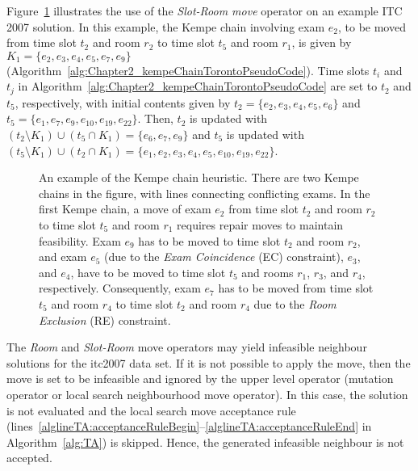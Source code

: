 Figure~\ref{fig:ITC2007KempeChain} illustrates the use of the \textit{Slot-Room move} operator on an example ITC 2007 solution. In this example, the Kempe chain involving exam $e_2$, to be moved from time slot $t_2$ and room $r_2$ to time slot $t_5$ and room $r_1$, is given by $K_1 = \{ e_2, e_3, e_4, e_5, e_7, e_9 \}$ (Algorithm~\ref{alg:Chapter2_kempeChainTorontoPseudoCode}). Time slots $t_i$ and $t_j$ in Algorithm~\ref{alg:Chapter2_kempeChainTorontoPseudoCode} are set to $t_2$ and $t_5$, respectively, with initial contents given by $t_2 = \{ e_2, e_3, e_4, e_5, e_6 \}$ and $t_5 = \{ e_1, e_7, e_9, e_{10}, e_{19}, e_{22} \}$. Then, $t_2$ is updated with $(t_2 \setminus K_1) \cup (t_5 \cap K_1) = \{ e_6, e_7, e_9 \}$ and $t_5$ is updated with $(t_5 \setminus K_1) \cup (t_2 \cap K_1) = \{ e_1, e_2, e_3, e_4, e_5,  e_{10}, e_{19}, e_{22} \}$.



\begin{figure}[!ht]
	\centering
	
	\caption{An example of the Kempe chain heuristic. There are two Kempe chains in the figure, with lines connecting conflicting exams. In the first Kempe chain, a move of exam $e_2$ from time slot $t_2$ and room $r_2$ to time slot $t_5$ and room $r_1$ requires repair moves to maintain feasibility. Exam $e_9$ has to be moved to time slot $t_2$ and room $r_2$, and exam $e_5$ (due to the \textit{Exam Coincidence} (EC) constraint), $e_3$, and $e_4$, have to be moved to time slot $t_5$ and rooms $r_1$, $r_3$, and $r_4$, respectively. Consequently, exam $e_7$ has to be moved from time slot $t_5$ and room $r_4$ to time slot $t_2$ and room $r_4$ due to the \textit{Room Exclusion} (RE) constraint.}
	\label{fig:ITC2007KempeChain}
\end{figure}


The \textit{Room} and \textit{Slot-Room} move operators may yield infeasible neighbour solutions for the \gls{itc2007} data set. If it is not possible to apply the move, then the move is set to be infeasible and ignored by the upper level operator (mutation operator or local search neighbourhood move operator). In this case, the solution is not evaluated and the local search move acceptance rule (lines~\ref{alglineTA:acceptanceRuleBegin}--\ref{alglineTA:acceptanceRuleEnd} in Algorithm~\ref{alg:TA}) is skipped. Hence, the generated infeasible neighbour is not accepted.

